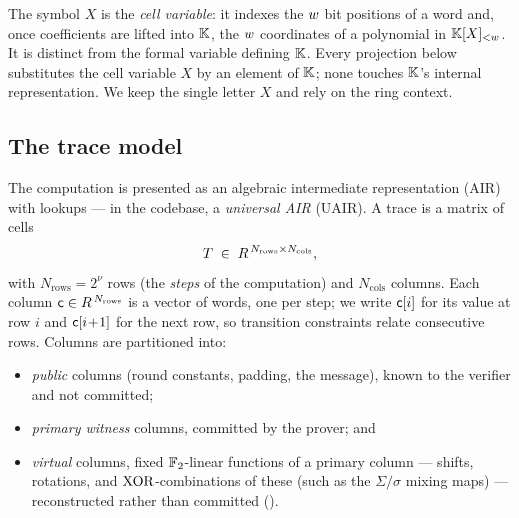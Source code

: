 \begin{remark}
\label{rem:two-X}
The symbol $X$ is the \emph{cell variable}: it indexes the $w$ bit
positions of a word and, once coefficients are lifted into $\mathbb{K}$, the
$w$ coordinates of a polynomial in $\mathbb{K}[X]_{<w}$. It is distinct from the
formal variable defining $\mathbb{K}$. Every projection below substitutes the
cell variable $X$ by an element of $\mathbb{K}$; none touches $\mathbb{K}$'s internal
representation. We keep the single letter $X$ and rely on the ring
context.
\end{remark}

\subsection{The trace model}
\label{sec:trace}

The computation is presented as an algebraic intermediate representation
(AIR) with lookups --- in the codebase, a \emph{universal AIR} (UAIR).
A trace is a matrix of cells
\[
  T \;\in\; R^{\,N_{\mathrm{rows}} \times N_{\mathrm{cols}}},
\]
with $N_{\mathrm{rows}} = 2^{\nu}$ rows (the \emph{steps} of the
computation) and $N_{\mathrm{cols}}$ columns. Each column
$\mathsf{c}\in R^{\,N_{\mathrm{rows}}}$ is a vector of words, one per
step; we write $\mathsf{c}[i]$ for its value at row $i$ and $\mathsf{c}[i\!+\!1]$
for the next row, so transition constraints relate consecutive rows.
Columns are partitioned into:
\begin{itemize}[leftmargin=2em]
  \item \emph{public} columns (round constants, padding, the message),
    known to the verifier and not committed;
  \item \emph{primary witness} columns, committed by the prover; and
  \item \emph{virtual} columns, fixed $\mathbb{F}_2$-linear functions of a
    primary column --- shifts, rotations, and $\operatorname{XOR}$-combinations of these
    (such as the $\Sigma/\sigma$ mixing maps) --- reconstructed rather than
    committed ().
\end{itemize}

